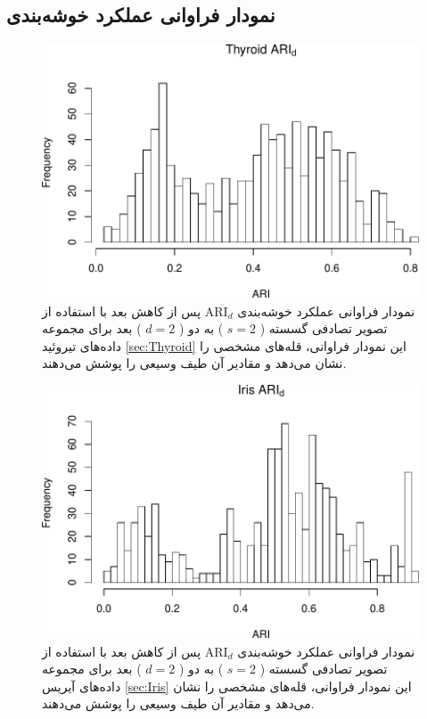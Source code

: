 \subsection{نمودار فراوانی عملکرد خوشه‌بندی}


\begin{figure}[H]
\centering
\includegraphics[width=0.7\linewidth]{Report_files/figure-latex/unnamed-chunk-15-1}
\caption{
نمودار فراوانی عملکرد خوشه‌بندی 
$\mathrm{ARI}_d$
پس از کاهش بعد با استفاده از تصویر تصادفی
گسسته (%
$s=2$%
)
به دو (%
$d=2$%
)
بعد برای مجموعه داده‌های
تیروئید
\ref{sec:Thyroid}
این نمودار فراوانی،
قله‌های
مشخصی را نشان 
می‌دهد
و مقادیر آن طیف 
وسیعی را پوشش می‌دهند.
}
\end{figure}

\begin{figure}[H]
\centering
\includegraphics[width=0.7\linewidth]{Report_files/figure-latex/unnamed-chunk-15-2}
\caption{
نمودار فراوانی عملکرد خوشه‌بندی 
$\mathrm{ARI}_d$
پس از کاهش بعد با استفاده از تصویر تصادفی
گسسته (%
$s=2$%
)
به دو (%
$d=2$%
)
بعد برای مجموعه داده‌های
آیریس
\ref{sec:Iris}
این نمودار فراوانی،
قله‌های
مشخصی را نشان 
می‌دهد
و مقادیر آن طیف 
وسیعی را پوشش می‌دهند.
}
\end{figure}

